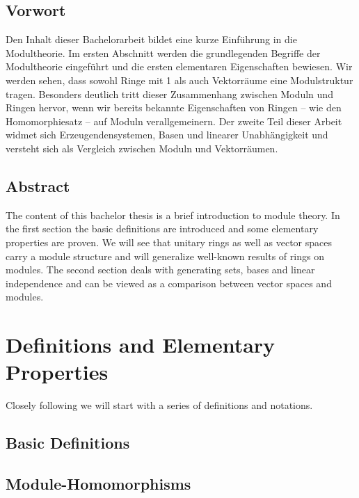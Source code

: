 \newpage

\thispagestyle{empty}

\begin{de}
\section*{Vorwort}
Den Inhalt dieser Bachelorarbeit bildet eine kurze Einf\"uhrung in die Modultheorie. Im ersten Abschnitt werden die grundlegenden Begriffe der Modultheorie eingef\"uhrt und die ersten elementaren Eigenschaften bewiesen. Wir werden sehen, dass sowohl Ringe mit 1 als auch Vektorr\"aume eine Modulstruktur tragen. Besonders deutlich tritt dieser Zusammenhang zwischen Moduln und Ringen hervor, wenn wir bereits bekannte Ei\-gen\-schaf\-ten von Ringen -- wie den Homomorphiesatz -- auf Moduln verallgemeinern. Der zweite Teil dieser Arbeit widmet sich Er\-zeug\-en\-den\-sys\-tem\-en, Basen und linearer Unabh\"angigkeit und versteht sich als Vergleich zwischen Moduln und Vektorr\"aumen.
\end{de}
\vspace{1.5cm}
\section*{Abstract}
The content of this bachelor thesis is a brief introduction to module theory. In the first section the basic definitions are introduced and some elementary properties are proven. We will see that unitary rings as well as vector spaces carry a module structure and will generalize well-known results of rings on modules. The second section deals with generating sets, bases and linear independence and can be viewed as a comparison between vector spaces and modules.

\newpage

\chapter{Definitions and Elementary Properties}

	Closely following \cite[Chap.VII]{jantzen2005algebra} we will start with a series of definitions and notations.
	
	\section{Basic Definitions}
	
		

	\section{Module-Homomorphisms}
		
